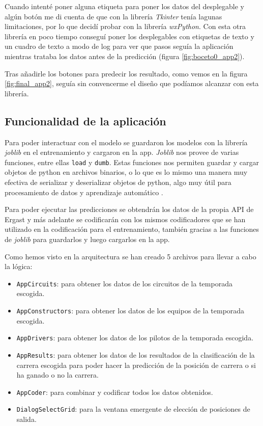 Cuando intenté poner alguna etiqueta para poner los datos del desplegable y algún botón me di cuenta de que con la librería \textit{Tkinter} tenía lagunas limitaciones, por lo que decidí probar con la librería \textit{wxPython}. Con esta otra librería en poco tiempo conseguí poner los desplegables con etiquetas de texto y un cuadro de texto a modo de log para ver que pasos seguía la aplicación mientras trataba los datos antes de la predicción (figura \ref{fig:boceto0_app2}).


Tras añadirle los botones para predecir los resultado, como vemos en la figura \ref{fig:final_app2}, seguía sin convencerme el diseño que podíamos alcanzar con esta librería.


\subsection{Funcionalidad de la aplicación}

Para poder interactuar con el modelo se guardaron los modelos con la librería \textit{joblib} en el entrenamiento y cargaron en la app. \textit{Joblib} nos provee de varias funciones, entre ellas \texttt{load} y  \texttt{dumb}. Estas funciones nos permiten guardar y cargar objetos de python en archivos binarios, o lo que es lo mismo una manera muy efectiva de serializar y deserializar objetos de python, algo muy útil para procesamiento de datos y aprendizaje automático \cite{python:joblib}.

Para poder ejecutar las predicciones se obtendrán los datos de la propia API de Ergast y más adelante se codificarán con los mismos codificadores que se han utilizado en la codificación para el entrenamiento, también gracias a las funciones de \textit{joblib} para guardarlos y luego cargarlos en la app. 

Como hemos visto en la arquitectura se han creado 5 archivos para llevar a cabo la lógica:
\begin{itemize}
    \item \texttt{AppCircuits}: para obtener los datos de los circuitos de la temporada escogida.
    \item \texttt{AppConstructors}: para obtener los datos de los equipos de la temporada escogida.
    \item \texttt{AppDrivers}: para obtener los datos de los pilotos de la temporada escogida.
    \item \texttt{AppResults}: para obtener los datos de los resultados de la clasificación de la carrera escogida para poder hacer la predicción de la posición de carrera o si ha ganado o no la carrera.
    \item \texttt{AppCoder}: para combinar y codificar todos los datos obtenidos.
    \item \texttt{DialogSelectGrid}: para la ventana emergente de elección de posiciones de salida.
\end{itemize}
